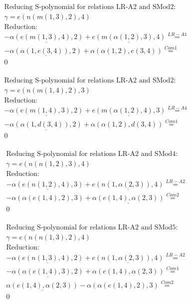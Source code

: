 \documentclass[11pt]{amsart}
\begin{document}
\begin{align*} 
& \text{Reducing S-polynomial for relations LR-A2 and SMod2:} \\ 
& \gamma = e(n(m(1,3),2),4) \\ 
& \text{Reduction}: \\& - \underline{\alpha(e(m(1,3),4),2)} + \underline{e(m(\alpha(1,2),3),4)} \stackrel{ LR-A1 }{=}  \\ 
& - \underline{\alpha(\alpha(1,e(3,4)),2)} + \alpha(\alpha(1,2),e(3,4)) \stackrel{ Com1 }{=}  \\ 
&0\\ 
\end{align*} 
 
\begin{align*} 
& \text{Reducing S-polynomial for relations LR-A2 and SMod2:} \\ 
& \gamma = e(n(m(1,4),2),3) \\ 
& \text{Reduction}: \\& - \underline{\alpha(e(m(1,4),3),2)} + \underline{e(m(\alpha(1,2),4),3)} \stackrel{ LR-A4 }{=}  \\ 
& - \underline{\alpha(\alpha(1,d(3,4)),2)} + \alpha(\alpha(1,2),d(3,4)) \stackrel{ Com1 }{=}  \\ 
&0\\ 
\end{align*} 
 
\begin{align*} 
& \text{Reducing S-polynomial for relations LR-A2 and SMod4:} \\ 
& \gamma = e(n(n(1,2),3),4) \\ 
& \text{Reduction}: \\& - \underline{\alpha(e(n(1,2),4),3)} + \underline{e(n(1,\alpha(2,3)),4)} \stackrel{ LR-A2 }{=}  \\ 
& - \alpha(\alpha(e(1,4),2),3) + \underline{\alpha(e(1,4),\alpha(2,3))} \stackrel{ Com2 }{=}  \\ 
&0\\ 
\end{align*} 
 
\begin{align*} 
& \text{Reducing S-polynomial for relations LR-A2 and SMod5:} \\ 
& \gamma = e(n(n(1,3),2),4) \\ 
& \text{Reduction}: \\& - \underline{\alpha(e(n(1,3),4),2)} + \underline{e(n(1,\alpha(2,3)),4)} \stackrel{ LR-A2 }{=}  \\ 
& - \underline{\alpha(\alpha(e(1,4),3),2)} + \alpha(e(1,4),\alpha(2,3)) \stackrel{ Com1 }{=}  \\ 
&\underline{\alpha(e(1,4),\alpha(2,3))} - \alpha(\alpha(e(1,4),2),3) \stackrel{ Com2 }{=}  \\ 
&0\\ 
\end{align*} 
 
\end{document}
